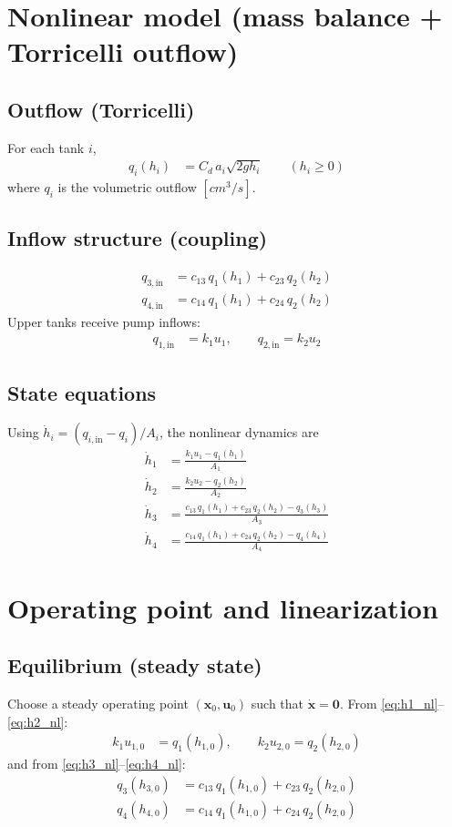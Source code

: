 \documentclass[11pt]{article}
\begin{document}
\section{Nonlinear model (mass balance + Torricelli outflow)}
\subsection{Outflow (Torricelli)}
For each tank \(i\),
\begin{align}
q_i(h_i) &= C_d\, a_i \sqrt{2 g h_i}
\qquad (h_i \ge 0)
\label{eq:torricelli}
\end{align}
where \(q_i\) is the volumetric outflow \([\si{cm^3/s}]\).

\subsection{Inflow structure (coupling)}
\begin{align*}
q_{3,\text{in}} &= c_{13}\, q_1(h_1) + c_{23}\, q_2(h_2)\\
q_{4,\text{in}} &= c_{14}\, q_1(h_1) + c_{24}\, q_2(h_2)
\end{align*}
Upper tanks receive pump inflows:
\begin{align*}
q_{1,\text{in}} &= k_1 u_1,\qquad
q_{2,\text{in}} = k_2 u_2
\end{align*}

\subsection{State equations}
Using \(\dot{h}_i = (q_{i,\text{in}} - q_i)/A_i\), the nonlinear dynamics are
\begin{align}
\dot{h}_1 &= \frac{k_1 u_1 - q_1(h_1)}{A_1}
\label{eq:h1_nl}\\
\dot{h}_2 &= \frac{k_2 u_2 - q_2(h_2)}{A_2}
\label{eq:h2_nl}\\
\dot{h}_3 &= \frac{c_{13}\, q_1(h_1) + c_{23}\, q_2(h_2) - q_3(h_3)}{A_3}
\label{eq:h3_nl}\\
\dot{h}_4 &= \frac{c_{14}\, q_1(h_1) + c_{24}\, q_2(h_2) - q_4(h_4)}{A_4}
\label{eq:h4_nl}
\end{align}

\section{Operating point and linearization}
\subsection{Equilibrium (steady state)}
Choose a steady operating point \((\bm{x}_0,\bm{u}_0)\) such that \(\dot{\bm{x}}=\bm{0}\).
From \eqref{eq:h1_nl}--\eqref{eq:h2_nl}:
\begin{align}
k_1 u_{1,0} &= q_1(h_{1,0}), \qquad
k_2 u_{2,0} = q_2(h_{2,0})
\label{eq:upper_eq}
\end{align}
and from \eqref{eq:h3_nl}--\eqref{eq:h4_nl}:
\begin{align}
q_3(h_{3,0}) &= c_{13}\, q_1(h_{1,0}) + c_{23}\, q_2(h_{2,0}) \\
q_4(h_{4,0}) &= c_{14}\, q_1(h_{1,0}) + c_{24}\, q_2(h_{2,0})
\end{align}
\end{document}
